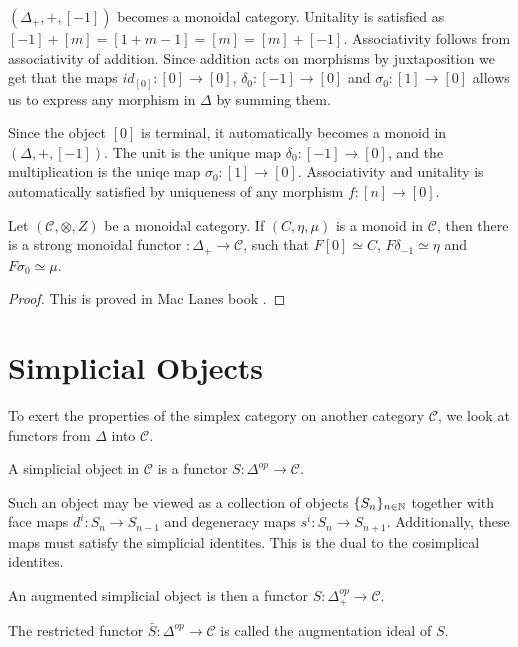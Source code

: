 \documentclass[../thesis.tex]{subfiles}
\begin{document}
        $(\Delta_+,+,[-1])$ becomes a monoidal category. Unitality is satisfied as $[-1]+[m] = [1+m-1] = [m] = [m] + [-1]$. Associativity follows from associativity of addition. Since addition acts on morphisms by juxtaposition we get that the maps $id_[0] : [0] \rightarrow [0]$, $\delta_0 : [-1] \rightarrow [0]$ and $\sigma_0 : [1] \rightarrow [0]$ allows us to express any morphism in $\Delta$ by summing them.

        Since the object $[0]$ is terminal, it automatically becomes a monoid in $(\Delta, +, [-1])$. The unit is the unique map $\delta_0 : [-1] \rightarrow [0]$, and the multiplication is the uniqe map $\sigma_0 : [1] \rightarrow [0]$. Associativity and unitality is automatically satisfied by uniqueness of any morphism $f:[n]\rightarrow [0]$.
        \begin{proposition}\label{prop: universal-monoid}
            Let $(\mathcal{C}, \otimes, Z)$ be a monoidal category. If $(C, \eta, \mu)$ is a monoid in $\mathcal{C}$, then there is a strong monoidal functor $:\Delta_+\rightarrow \mathcal{C}$, such that $F[0] \simeq C$, $F\delta_{-1} \simeq \eta$ and $F\sigma_0 \simeq \mu$.
        \end{proposition} 

        \begin{proof}
            This is proved in Mac Lanes book \cite{MacLane71}.
        \end{proof}


    \section{Simplicial Objects}
        To exert the properties of the simplex category on another category $\mathcal{C}$, we look at functors from $\Delta$ into $\mathcal{C}$. 
        
        \begin{definition}
            A simplicial object in $\mathcal{C}$ is a functor $S:\Delta^{op}\rightarrow \mathcal{C}$. 
        \end{definition}
        Such an object may be viewed as a collection of objects $\{S_n\}_{n\in\mathbb{N}}$ together with face maps $d^i:S_n\rightarrow S_{n-1}$ and degeneracy maps $s^i:S_n \rightarrow S_{n+1}$. Additionally, these maps must satisfy the simplicial identites. This is the dual to the cosimplical identites.
        
        \begin{definition}
            An augmented simplicial object is then a functor $S:\Delta_+^{op}\rightarrow \mathcal{C}$. 
            
            The restricted functor $\bar{S}:\Delta^{op}\rightarrow \mathcal{C}$ is called the augmentation ideal of $S$. 
        \end{definition}
\end{document}
